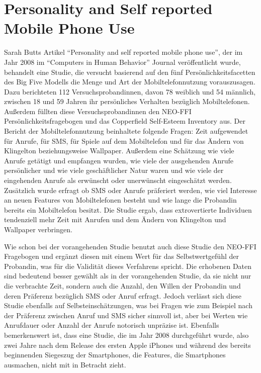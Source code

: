 \section*{Personality and Self reported Mobile Phone Use}

Sarah Butts Artikel "`Personality and self reported mobile phone use"', der im Jahr 2008 im "`Computers in Human Behavior"' Journal veröffentlicht wurde,
behandelt eine Studie, die versucht basierend auf den fünf Persönlichkeitsfacetten des Big Five Modells die Menge und Art der Mobiltelefonnutzung vorauszusagen.
Dazu berichteten 112 Versuchsprobandinnen, davon 78 weiblich und 54 männlich, zwischen 18 und 59 Jahren ihr persönliches Verhalten bezüglich Mobiltelefonen.
Außerdem füllten diese Versuchsprobandinnen den NEO-FFI Persönlichkeitsfragebogen und das Copperfield Self-Esteem Inventory aus.
Der Bericht der Mobiltelefonnutzung beinhaltete folgende Fragen: Zeit aufgewendet für Anrufe, für SMS, für Spiele auf dem Mobiltelefon und für das Ändern von Klingelton beziehungsweise Wallpaper.
Außerdem eine Schätzung wie viele Anrufe getätigt und empfangen wurden, wie viele der ausgehenden Anrufe persönlicher und wie viele geschäftlicher Natur waren und wie viele der eingehenden Anrufe als erwünscht oder unerwünscht eingeschätzt werden.
Zusätzlich wurde erfragt ob SMS oder Anrufe präferiert werden, wie viel Interesse an neuen Features von Mobiltelefonen besteht und wie lange die Probandin bereits ein Mobiltelefon besitzt.
Die Studie ergab, dass extrovertierte Individuen tendenziell mehr Zeit mit Anrufen und dem Ändern von Klingelton und Wallpaper verbringen.
\par
Wie schon bei der vorangehenden Studie benutzt auch diese Studie den NEO-FFI Fragebogen und ergänzt diesen mit einem Wert für das Selbstwertgefühl der Probandin, was für die Validität dieses Verfahrens spricht.
Die erhobenen Daten sind bedeutend besser gewählt als in der vorangehenden Studie, da sie nicht nur die verbrachte Zeit, sondern auch die Anzahl, den Willen der Probandin und deren Präferenz bezüglich SMS oder Anruf erfragt.
Jedoch verlässt sich diese Studie ebenfalls auf Selbsteinschätzungen, was bei Fragen wie zum Beispiel nach der Präferenz zwischen Anruf und SMS sicher sinnvoll ist, aber bei Werten wie Anrufdauer oder Anzahl der Anrufe notorisch unpräzise ist.
Ebenfalls bemerkenswert ist, dass eine Studie, die im Jahr 2008 durchgeführt wurde, also zwei Jahre nach dem Release des ersten Apple iPhones und während des bereits beginnenden Siegeszug der Smartphones, die Features, die Smartphones ausmachen, nicht mit in Betracht zieht.

